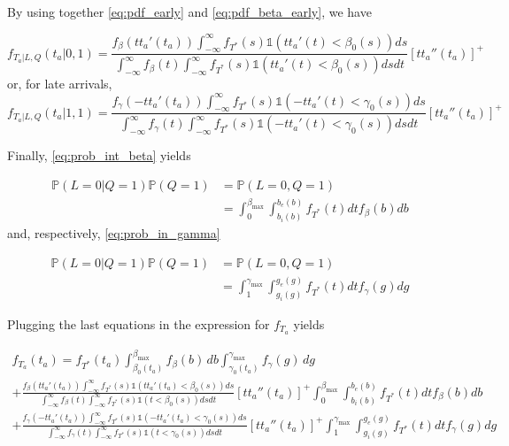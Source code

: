 \documentclass{article}
\begin{document}
By using together \eqref{eq:pdf_early} and \eqref{eq:pdf_beta_early}, we have

\begin{equation*}
  f_{T_a | L, Q}(t_a | 0, 1) = \frac{f_\beta(tt_a'(t_a))\int_{-\infty}^\infty f_{T^*}(s) \mathbb{1}(tt_a'(t) < \beta_0(s)) ds}{\int_{-\infty}^\infty f_\beta(t)\int_{-\infty}^\infty f_{T^*}(s) \mathbb{1}(tt_a'(t) < \beta_0(s)) ds dt}[tt_a''(t_a)]^+ 
\end{equation*}
or, for late arrivals,
\begin{equation*}
  f_{T_a | L, Q}(t_a | 1, 1) = \frac{f_\gamma(-tt_a'(t_a))\int_{-\infty}^\infty f_{T^*}(s) \mathbb{1}(-tt_a'(t) < \gamma_0(s)) ds}{\int_{-\infty}^\infty f_\gamma(t)\int_{-\infty}^\infty f_{T^*}(s) \mathbb{1}(-tt_a'(t) < \gamma_0(s)) ds dt}[tt_a''(t_a)]^+ 
\end{equation*}

Finally, \eqref{eq:prob_int_beta} yields

\begin{align*}
  \mathbb{P}(L=0 | Q=1)\mathbb{P}(Q = 1) & = \mathbb{P}(L=0, Q=1) \\
  & = \int_0^{\beta_\text{max}}\int_{b_i(b)}^{b_e(b)} f_{T^*}(t)dtf_\beta(b)db
\end{align*}
and, respectively, \eqref{eq:prob_in_gamma}

\begin{align*}
  \mathbb{P}(L=0 | Q=1)\mathbb{P}(Q = 1) & = \mathbb{P}(L=0, Q=1) \\
  & = \int_1^{\gamma_\text{max}}\int_{g_i(g)}^{g_e(g)} f_{T^*}(t)dtf_\gamma(g)dg
\end{align*}

Plugging the last equations in the expression for \(f_{T_a}\) yields

\begin{multline}
  \label{eq:final_likelihood}
  f_{T_a}(t_a) = f_{T^*}(t_a)\int_{\beta_0(t_a)}^{\beta_\text{max}}f_\beta(b)\, db\int_{\gamma_0(t_a)}^{\gamma_\text{max}}f_\gamma(g)\, dg \\
  + \frac{f_\beta(tt_a'(t_a))\int_{-\infty}^\infty f_{T^*}(s) \mathbb{1}(tt_a'(t_a) < \beta_0(s)) ds}{\int_{-\infty}^\infty f_\beta(t)\int_{-\infty}^\infty f_{T^*}(s) \mathbb{1}(t < \beta_0(s)) ds dt}[tt_a''(t_a)]^+ \int_0^{\beta_\text{max}}\int_{b_i(b)}^{b_e(b)} f_{T^*}(t)dtf_\beta(b)db \\
  + \frac{f_\gamma(-tt_a'(t_a))\int_{-\infty}^\infty f_{T^*}(s) \mathbb{1}(-tt_a'(t_a) < \gamma_0(s)) ds}{\int_{-\infty}^\infty f_\gamma(t)\int_{-\infty}^\infty f_{T^*}(s) \mathbb{1}(t < \gamma_0(s)) ds dt}[tt_a''(t_a)]^+ \int_1^{\gamma_\text{max}}\int_{g_i(g)}^{g_e(g)} f_{T^*}(t)dtf_\gamma(g)dg
\end{multline}
\end{document}
